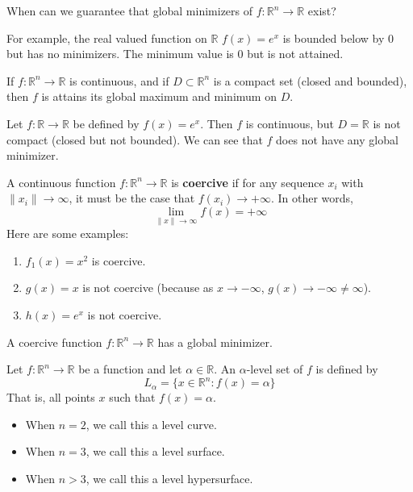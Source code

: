\begin{problem}[Motivation]
  When can we guarantee that global minimizers of $f: \mathbb R^n \rightarrow \mathbb R$ exist?

  For example, the real valued function on $\mathbb R$ $f(x) = e^x$ is bounded below by 0 but has no minimizers. The minimum value is 0 but is not attained.
\end{problem}
\begin{proposition}
  If $f: \mathbb R^n \rightarrow \mathbb R$ is continuous, and if $D \subset \mathbb R^n$ is a compact set (closed and bounded), then $f$ is attains its global maximum and minimum on $D$.
\end{proposition}
\begin{problem}
  Let $f: \mathbb R \rightarrow \mathbb R$ be defined by $f(x) = e^x$. Then $f$ is continuous, but $D = \mathbb R$ is not compact (closed but not bounded). We can see that $f$ does not have any global minimizer.
  
\end{problem}
\begin{definition}
  A continuous function $f: \mathbb R^n \rightarrow \mathbb R$ is \textbf{coercive} if for any sequence $x_i$ with $\|x_i \| \rightarrow \infty$, it must be the case that $f(x_i) \rightarrow +\infty$. In other words, $$\lim_{\|x\| \rightarrow \infty} f(x) = +\infty$$
  Here are some examples:
  \begin{enumerate}
    \item $f_1(x) = x^2$ is coercive.
    \item $g(x) = x$ is not coercive (because as $x \rightarrow -\infty$, $g(x) \rightarrow -\infty \neq \infty$).
    \item $h(x) = e^x$ is not coercive.
  \end{enumerate}
\end{definition}
\begin{proposition}
  A coercive function $f: \mathbb R^n \rightarrow \mathbb R$ has a global minimizer.
\end{proposition}
\begin{definition}
  Let $f: \mathbb R^n \to \mathbb R$ be a function and let $\alpha \in \mathbb R$. An $\alpha$-level set of $f$ is defined by $$L_\alpha = \{x \in \mathbb R^n: f(x) = \alpha\}$$
  That is, all points $x$ such that $f(x) = \alpha$.
  \begin{itemize}
    \item When $n = 2$, we call this a level curve.
    \item When $n = 3$, we call this a level surface.
    \item When $n > 3$, we call this a level hypersurface.
  \end{itemize}
\end{definition}
